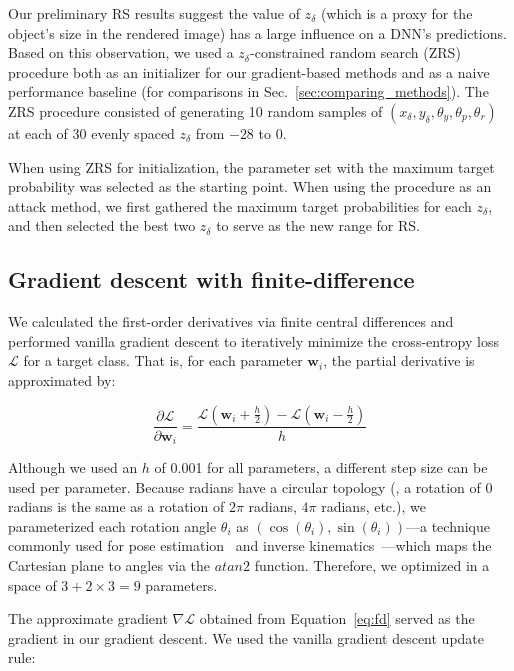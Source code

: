\documentclass[10pt,twocolumn,letterpaper]{article}
\newcommand{\w}{\mathbf{w}}
\newcommand{\LL}{\mathcal{L}}
\begin{document}
Our preliminary RS results suggest the value of $z_{\delta}$ (which is a proxy for the object's size in the rendered image) has a large influence on a DNN's predictions.
Based on this observation, we used a $z_{\delta}$-constrained random search (ZRS) procedure both as an initializer for our gradient-based methods and as a naive performance baseline (for comparisons in Sec.~\ref{sec:comparing_methods}).
The ZRS procedure consisted of generating 10 random samples of $(x_{\delta}, y_{\delta}, \theta_{y}, \theta_{p}, \theta_{r})$ at each of 30 evenly spaced $z_{\delta}$ from $-28$ to $0$.

When using ZRS for initialization, the parameter set with the maximum target probability was selected as the starting point.
When using the procedure as an attack method, we first gathered the maximum target probabilities for each $z_{\delta}$, and then selected the best two $z_{\delta}$ to serve as the new range for RS.

\subsection{Gradient descent with finite-difference}
\label{sec:fd}

We calculated the first-order derivatives via finite central differences and performed vanilla gradient descent to iteratively minimize the cross-entropy loss $\LL$ for a target class.
That is, for each parameter $\w_{i}$, the partial derivative is approximated by:

\begin{equation} \label{eq:fd}
\frac{\partial \LL}{\partial \w_{i}} = \frac{\LL(\w_{i} + \frac{h}{2}) - \LL(\w_{i} - \frac{h}{2})}{h}
\end{equation}

\noindent
Although we used an $h$ of 0.001 for all parameters, a different step size can be used per parameter.
Because radians have a circular topology (\ie, a rotation of 0 radians is the same as a rotation of $2\pi$ radians, $4\pi$ radians, etc.), we parameterized each rotation angle $\theta_i$ as $(\cos(\theta_i), \sin(\theta_i))$---a technique commonly used for pose estimation~\cite{Osadchy2005} and inverse kinematics~\cite{Choi1992}---which maps the Cartesian plane to angles via the $atan2$ function.
Therefore, we optimized in a space of $3 + 2 \times 3 = 9$ parameters.

The approximate gradient $\nabla \LL$ obtained from Equation~\eqref{eq:fd} served as the gradient in our gradient descent.
We used the vanilla gradient descent update rule:
\end{document}
